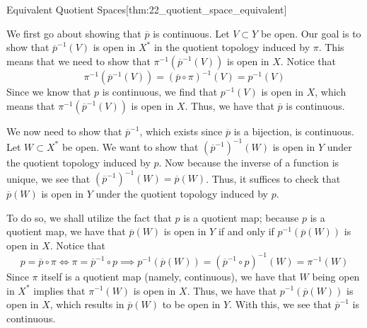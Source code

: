 \begin{thmBox}{Equivalent Quotient Spaces}[thm:22_quotient_space_equivalent]
\begin{proofBox}
        \baseSkip

        We first go about showing that \( \overline{ p } \) is continuous.
        Let \( V \subset Y \) be open.
        Our goal is to show that \( \overline{ p }^{ -1 } ( V ) \) is open
        in \( X^{ * } \) in the quotient topology induced by \( \pi \).
        This means that we need to show that \( \pi^{ -1 } (
        \overline{ p }^{ -1 } ( V ) ) \) is open in \( X \).
        Notice that
        \begin{equation*}
            \pi^{ -1 } ( \overline{ p }^{ -1 } ( V ) )
            =
            ( \overline{ p } \circ \pi )^{ -1 } ( V )
            =
            p^{ -1 } ( V )
        \end{equation*}
        Since we know that \( p \) is continuous, we find that \( p^{ -1 } 
        ( V ) \) is open in \( X \), which means that 
        \( \pi^{ -1 } ( \overline{ p }^{ -1 } ( V ) ) \) is open in \( X \).
        Thus, we have that \( \overline{ p } \) is continuous.

        \baseSkip

        We now need to show that \( \overline{ p }^{ -1 } \), which exists
        since \( \overline{ p } \) is a bijection, is continuous.
        Let \( W \subset X^{ * } \) be open.
        We want to show that \( ( \overline{ p }^{ -1 } )^{ -1 } ( W ) \) is 
        open in \( Y \) under the quotient topology induced by \( p \).
        Now because the inverse of a function is unique, we see that 
        \( ( \overline{ p }^{ -1 } )^{ -1 } ( W ) = \overline{ p } ( W ) \).
        Thus, it suffices to check that \( \overline{ p } ( W ) \) is open
        in \( Y \) under the quotient topology induced by \( p \).

        \baseSkip 

        To do so, we shall utilize the fact that \( p \) is a quotient map;
        because \( p \) is a quotient map, we have that 
        \( \overline{ p } ( W ) \) is open in \( Y \) if and only if 
        \( p^{ -1 } ( \overline{ p } ( W ) ) \) is open in \( X \).
        Notice that
        \begin{equation*}
            p = \overline{ p } \circ \pi
            \iff 
            \pi = \overline{ p }^{ -1 } \circ p
            \implies 
            p^{ -1 } ( \overline{ p } ( W ) )
            =
            ( \overline{ p }^{ -1 } \circ p )^{ -1 } ( W )
            =
            \pi^{ -1 } ( W )
        \end{equation*}
        Since \( \pi \) itself is a quotient map (namely, continuous), we have 
        that \( W \) being open in \( X^{ * } \) implies that 
        \( \pi^{ -1 } ( W ) \) is open in \( X \).
        Thus, we have that \( p^{ -1 } ( \overline{ p } ( W ) ) \) is open in 
        \( X \), which results in \( \overline{ p } ( W ) \) to be
        open in \( Y \).
        With this, we see that \( \overline{ p }^{ -1 } \) is continuous.


\end{proofBox}
\end{thmBox}
